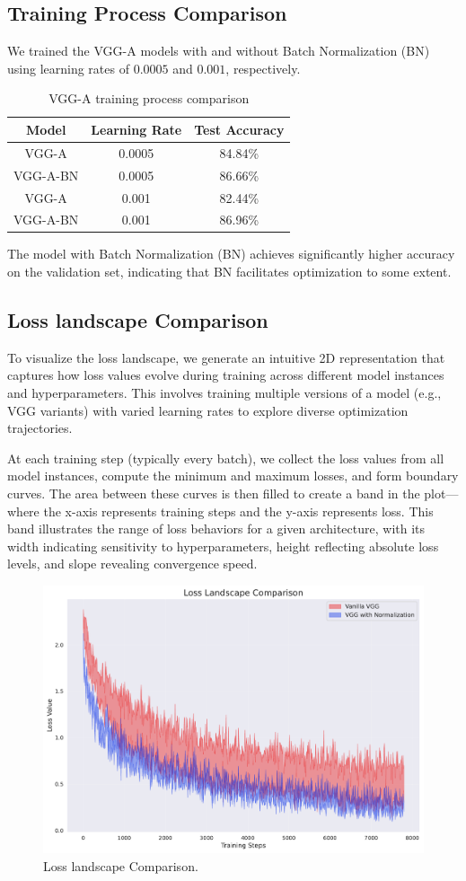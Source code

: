 \documentclass{article}
\begin{document}
\subsection{Training Process Comparison}

We trained the VGG-A models with and without Batch Normalization (BN) using learning rates of $0.0005$ and $0.001$, respectively.

\begin{table}[H]
    \centering
    \caption{VGG-A training process comparison}
    \label{tab:vgg_bn_results}
    \begin{tabular}{ccc}
        \toprule
        \textbf{Model} & \textbf{Learning Rate} & \textbf{Test Accuracy} \\
        \midrule
        VGG-A & 0.0005 & 84.84\% \\
        VGG-A-BN & 0.0005 & 86.66\% \\
        \midrule
        VGG-A & 0.001 & 82.44\% \\
        VGG-A-BN & 0.001 & 86.96\% \\
        \bottomrule
    \end{tabular}
\end{table}

The model with Batch Normalization (BN) achieves significantly higher accuracy on the validation set, indicating that BN facilitates optimization to some extent. 

\subsection{Loss landscape Comparison}

To visualize the loss landscape, we generate an intuitive 2D representation that captures how loss values evolve during training across different model instances and hyperparameters. This involves training multiple versions of a model (e.g., VGG variants) with varied learning rates to explore diverse optimization trajectories. 

At each training step (typically every batch), we collect the loss values from all model instances, compute the minimum and maximum losses, and form boundary curves. The area between these curves is then filled to create a band in the plot—where the x-axis represents training steps and the y-axis represents loss. This band illustrates the range of loss behaviors for a given architecture, with its width indicating sensitivity to hyperparameters, height reflecting absolute loss levels, and slope revealing convergence speed. 

\begin{figure}[H]
  \centering
  \includegraphics[width=0.8\linewidth]{figures/landscape_comparison.pdf}
  \caption{Loss landscape Comparison.}
  \label{fig:landscape_comparison}
\end{figure}
\end{document}
